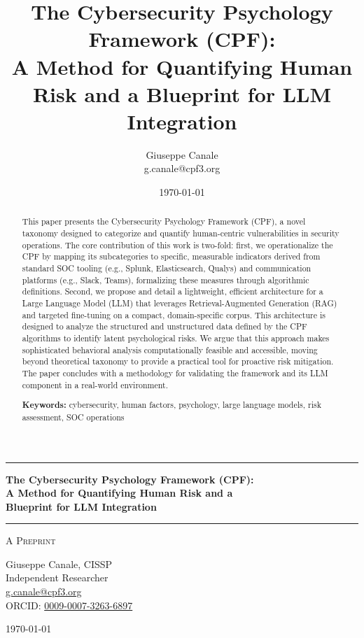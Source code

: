 \documentclass[11pt, a4paper]{article}
\title{The Cybersecurity Psychology Framework (CPF): \\ A Method for Quantifying Human Risk and a Blueprint for LLM Integration}
\author{Giuseppe Canale \\ g.canale@cpf3.org}
\date{\today}
\begin{document}
\thispagestyle{empty}
\begin{center}
\vspace*{0.5cm}
\rule{\textwidth}{1.5pt}
\vspace{0.5cm}

{\LARGE \textbf{The Cybersecurity Psychology Framework (CPF):}}\\[0.3cm]
{\LARGE \textbf{A Method for Quantifying Human Risk and a}}\\[0.3cm]
{\LARGE \textbf{Blueprint for LLM Integration}}

\vspace{0.5cm}
\rule{\textwidth}{1.5pt}
\vspace{0.3cm}

{\large \textsc{A Preprint}}

\vspace{0.5cm}

{\Large Giuseppe Canale, CISSP}\\[0.2cm]
Independent Researcher\\[0.1cm]
\href{mailto:g.canale@cpf3.org}{g.canale@cpf3.org} \\[0.1cm]
ORCID: \href{https://orcid.org/0009-0007-3263-6897}{0009-0007-3263-6897}

\vspace{0.8cm}
{\large \today}
\vspace{1cm}
\end{center}

\begin{abstract}
\noindent
This paper presents the Cybersecurity Psychology Framework (CPF), a novel taxonomy designed to categorize and quantify human-centric vulnerabilities in security operations. The core contribution of this work is two-fold: first, we operationalize the CPF by mapping its subcategories to specific, measurable indicators derived from standard SOC tooling (e.g., Splunk, Elasticsearch, Qualys) and communication platforms (e.g., Slack, Teams), formalizing these measures through algorithmic definitions. Second, we propose and detail a lightweight, efficient architecture for a Large Language Model (LLM) that leverages Retrieval-Augmented Generation (RAG) and targeted fine-tuning on a compact, domain-specific corpus. This architecture is designed to analyze the structured and unstructured data defined by the CPF algorithms to identify latent psychological risks. We argue that this approach makes sophisticated behavioral analysis computationally feasible and accessible, moving beyond theoretical taxonomy to provide a practical tool for proactive risk mitigation. The paper concludes with a methodology for validating the framework and its LLM component in a real-world environment.

\vspace{0.5em}
\noindent\textbf{Keywords:} cybersecurity, human factors, psychology, large language models, risk assessment, SOC operations
\end{abstract}
\end{document}
